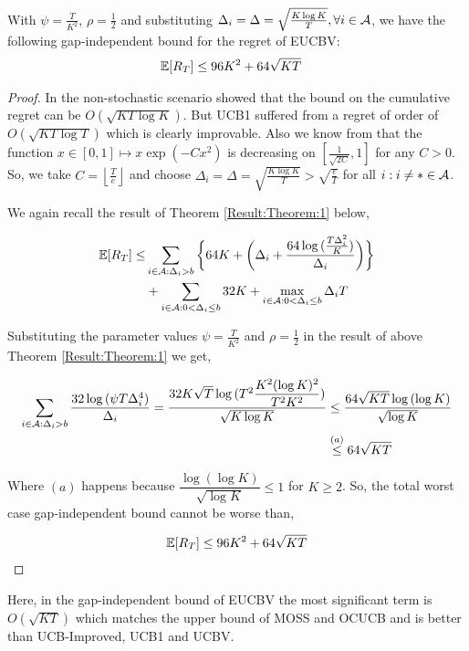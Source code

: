
\begin{corollary}
\label{Result:Corollary:1}
With $\psi=\frac{T}{K^2}$, $\rho=\frac{1}{2}$ and substituting $\Delta_i =\Delta = \sqrt{\frac{K\log K}{T}}, \forall i\in \mathcal{A}$, we have the following gap-independent bound for the regret of EUCBV:
\begin{align*}
\mathbb{E}[R_{T}] & \leq 96 K^2 + 64\sqrt{KT}
	\end{align*} 
\end{corollary}

\begin{proof}
\label{Proof:Corollary:1}
In the non-stochastic scenario \cite{auer2002nonstochastic} showed that the bound on the cumulative regret can be $O\left(\sqrt{KT\log K}\right)$. But UCB1 suffered from a regret of order of  $O\left(\sqrt{KT\log T}\right)$  which is clearly improvable. Also we know from \cite{bubeck2011pure} that the function $x\in [0,1]\mapsto x\exp(-Cx^2)$ is  decreasing on $\left[\frac{1}{\sqrt{2C}},1\right ]$ for any $C>0$. So, we take $C=\left\lfloor \frac{T}{e}\right\rfloor$ and choose  $\Delta_{i}=\Delta=\sqrt{\frac{K\log K}{T}}>\sqrt{\frac{e}{T}}$ for all ${i:i\neq *}\in \mathcal{A} $.

	We again recall the result of Theorem \ref{Result:Theorem:1} below, 
	
\begin{align*}
\mathbb{E} [R_{T}] \leq &\sum\limits_{i\in \mathcal{A} :\Delta_{i} > b}\bigg\lbrace 64 K + \bigg(\Delta_{i}+\dfrac{64\log{(\frac{T\Delta_{i}^{2}}{K})}}{\Delta_{i}}\bigg)\bigg \rbrace\\ 
  & +\sum\limits_{i\in \mathcal{A} :0 < \Delta_{i}\leq b} 32 K + \max_{i\in \mathcal{A} :0 < \Delta_{i}\leq b}\Delta_{i}T  
\end{align*}


Substituting the parameter values $\psi=\frac{T}{K^2}$ and $\rho=\frac{1}{2}$ in the result of above Theorem \ref{Result:Theorem:1} we get,
	
	\begin{align*}
	\sum_{i\in \mathcal{A} :\Delta_{i} > b}\dfrac{32\log{(\psi T\Delta_{i}^{4})}}{\Delta_{i}} = \dfrac{32K\sqrt{T}\log{(T^{2}\dfrac{K^{2}(\log K)^{2}}{T^{2} K^2})}}{\sqrt{K\log K}} &\leq  \dfrac{64\sqrt{KT}\log{(\log K)}}{\sqrt{\log K}}\\
	&\overset{(a)}{\leq} 64\sqrt{KT} 
	\end{align*}		
	
 	
	Where $(a)$ happens because $\dfrac{\log{(\log K)}}{\sqrt{\log K}}\leq 1$ for $K\geq 2$. So, the total worst case gap-independent bound cannot be worse than,
	
	\begin{align*}
	\mathbb{E}[R_{T}]\leq 96 K^2 + 64\sqrt{KT}
	\end{align*}		
\end{proof}


Here, in the gap-independent bound of EUCBV the most significant term is $O\left(\sqrt{KT}\right)$ which  matches the upper bound of MOSS and OCUCB and is better than UCB-Improved, UCB1 and UCBV.
